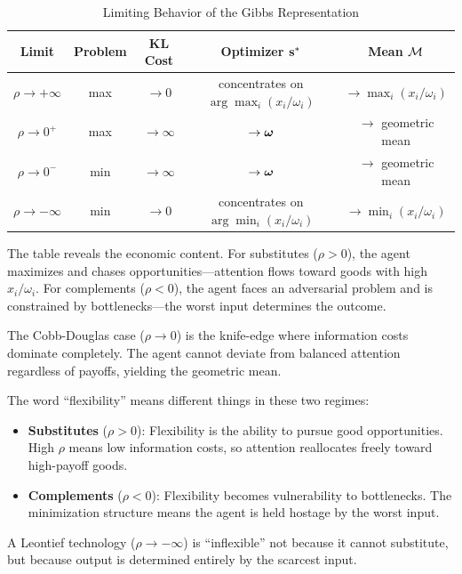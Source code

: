 \begin{table}[H]
\centering
\caption{Limiting Behavior of the Gibbs Representation}
\label{tab:gibbs-limits}
\begin{tabular}{@{}ccccc@{}}
\toprule
\textbf{Limit} & \textbf{Problem} & \textbf{KL Cost} & \textbf{Optimizer $\mathbf{s}^*$} & \textbf{Mean $\mathcal{M}$} \\
\midrule
$\rho \to +\infty$ & max & $\to 0$ & concentrates on $\arg\max_i(x_i/\omega_i)$ & $\to \max_i(x_i/\omega_i)$ \\
$\rho \to 0^+$ & max & $\to \infty$ & $\to \boldsymbol{\omega}$ & $\to$ geometric mean \\
$\rho \to 0^-$ & min & $\to \infty$ & $\to \boldsymbol{\omega}$ & $\to$ geometric mean \\
$\rho \to -\infty$ & min & $\to 0$ & concentrates on $\arg\min_i(x_i/\omega_i)$ & $\to \min_i(x_i/\omega_i)$ \\
\bottomrule
\end{tabular}
\end{table}

The table reveals the economic content. For substitutes ($\rho > 0$), the agent maximizes and chases opportunities---attention flows toward goods with high $x_i/\omega_i$. For complements ($\rho < 0$), the agent faces an adversarial problem and is constrained by bottlenecks---the worst input determines the outcome.

The Cobb-Douglas case ($\rho \to 0$) is the knife-edge where information costs dominate completely. The agent cannot deviate from balanced attention regardless of payoffs, yielding the geometric mean.

\begin{calloutimportant}
The word ``flexibility'' means different things in these two regimes:
\begin{itemize}[nosep]
    \item \textbf{Substitutes} ($\rho > 0$): Flexibility is the ability to pursue good opportunities. High $\rho$ means low information costs, so attention reallocates freely toward high-payoff goods.
    \item \textbf{Complements} ($\rho < 0$): Flexibility becomes vulnerability to bottlenecks. The minimization structure means the agent is held hostage by the worst input.
\end{itemize}
A Leontief technology ($\rho \to -\infty$) is ``inflexible'' not because it cannot substitute, but because output is determined entirely by the scarcest input.
\end{calloutimportant}

